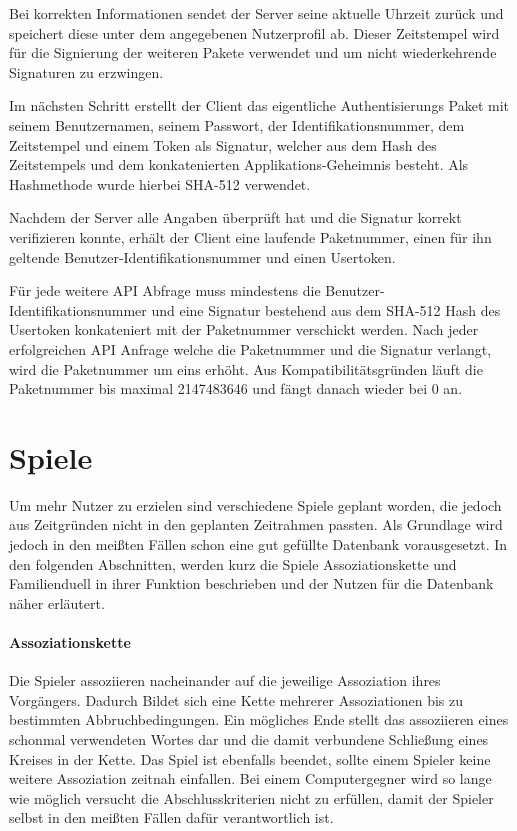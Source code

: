 Bei korrekten Informationen sendet der Server seine aktuelle Uhrzeit zurück
und speichert diese unter dem angegebenen Nutzerprofil ab. Dieser Zeitstempel
wird für die Signierung der weiteren Pakete verwendet und um nicht wiederkehrende
Signaturen zu erzwingen.

Im nächsten Schritt erstellt der Client das eigentliche Authentisierungs Paket mit
seinem Benutzernamen, seinem Passwort, der Identifikationsnummer, dem Zeitstempel
und einem Token als Signatur, welcher aus dem Hash des Zeitstempels und dem
konkatenierten Applikations-Geheimnis besteht. Als Hashmethode wurde hierbei
SHA-512 verwendet.

Nachdem der Server alle Angaben überprüft hat und die Signatur korrekt
verifizieren konnte, erhält der Client eine laufende Paketnummer, einen für ihn
geltende Benutzer-Identifikationsnummer und einen Usertoken.

Für jede weitere API Abfrage muss mindestens die Benutzer-Identifikationsnummer
und eine Signatur bestehend aus dem SHA-512 Hash des Usertoken konkateniert mit
der Paketnummer verschickt werden. Nach jeder erfolgreichen API Anfrage welche
die Paketnummer und die Signatur verlangt, wird die Paketnummer um eins erhöht.
Aus Kompatibilitätsgründen läuft die Paketnummer bis maximal 2147483646 und
fängt danach wieder bei 0 an.


\section{Spiele}
Um mehr Nutzer zu erzielen sind verschiedene Spiele geplant worden, die jedoch
aus Zeitgründen nicht in den geplanten Zeitrahmen passten.
Als Grundlage wird jedoch in den meißten Fällen schon eine gut gefüllte Datenbank
vorausgesetzt. In den folgenden Abschnitten, werden kurz die Spiele
Assoziationskette und Familienduell in ihrer Funktion beschrieben und der Nutzen
für die Datenbank näher erläutert.

\paragraph{Assoziationskette}
Die Spieler assoziieren nacheinander auf die jeweilige Assoziation ihres
Vorgängers. Dadurch Bildet sich eine Kette mehrerer Assoziationen bis
zu bestimmten Abbruchbedingungen. Ein mögliches Ende stellt das assoziieren
eines schonmal verwendeten Wortes dar und die damit verbundene Schließung eines
Kreises in der Kette. Das Spiel ist ebenfalls beendet, sollte einem Spieler
keine weitere Assoziation zeitnah einfallen. Bei einem Computergegner wird
so lange wie möglich versucht die Abschlusskriterien nicht zu erfüllen, damit
der Spieler selbst in den meißten Fällen dafür verantwortlich ist.

